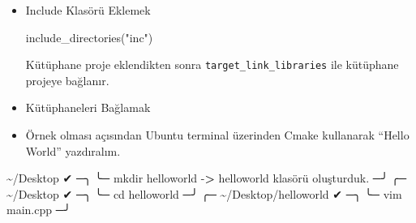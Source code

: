 \documentclass[
]{book}
\newenvironment{Shaded}{\begin{snugshade}}{\end{snugshade}}
\newcommand{\BuiltInTok}[1]{#1}
\newcommand{\ExtensionTok}[1]{#1}
\newcommand{\FunctionTok}[1]{\textcolor[rgb]{0.00,0.00,0.00}{#1}}
\newcommand{\KeywordTok}[1]{\textcolor[rgb]{0.13,0.29,0.53}{\textbf{#1}}}
\newcommand{\NormalTok}[1]{#1}
\newcommand{\OperatorTok}[1]{\textcolor[rgb]{0.81,0.36,0.00}{\textbf{#1}}}
\newcommand{\StringTok}[1]{\textcolor[rgb]{0.31,0.60,0.02}{#1}}
\newcommand{\VariableTok}[1]{\textcolor[rgb]{0.00,0.00,0.00}{#1}}
\providecommand{\tightlist}{%
  \setlength{\itemsep}{0pt}\setlength{\parskip}{0pt}}
\begin{document}
\begin{Shaded}
\end{Shaded}

\begin{itemize}
\item
  Include Klasörü Eklemek

\begin{Shaded}
\begin{Highlighting}[]
 \ExtensionTok{include\_directories}\NormalTok{(}\StringTok{"inc"}\NormalTok{)}
\end{Highlighting}
\end{Shaded}

  Kütüphane proje eklendikten sonra \texttt{target\_link\_libraries} ile kütüphane projeye bağlanır.
\item
  Kütüphaneleri Bağlamak
\end{itemize}

\begin{Shaded}
\end{Shaded}

\begin{itemize}
\tightlist
\item
  Örnek olması açısından Ubuntu terminal üzerinden Cmake kullanarak ``Hello World'' yazdıralım.
\end{itemize}

\begin{Shaded}
\begin{Highlighting}[]
     \ExtensionTok{\textasciitilde{}/Desktop}\NormalTok{                                                            ✔ ─╮}
\NormalTok{╰─ }\FunctionTok{mkdir}\NormalTok{ helloworld   {-}}\OperatorTok{>}\NormalTok{ helloworld klasörü oluşturduk.                     ─╯}
\NormalTok{╭─ }\ExtensionTok{\textasciitilde{}/Desktop}\NormalTok{                                                              ✔ ─╮}
\NormalTok{╰─ }\BuiltInTok{cd}\NormalTok{ helloworld                                                            ─╯}
\NormalTok{╭─ }\ExtensionTok{\textasciitilde{}/Desktop/helloworld}\NormalTok{                                                   ✔ ─╮}
\NormalTok{╰─ }\ExtensionTok{vim}\NormalTok{ main.cpp                                                             ─╯}
\end{Highlighting}
\end{Shaded}
\end{document}
